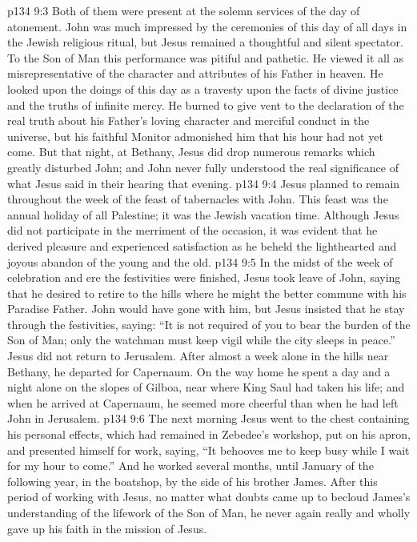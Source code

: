 \vs p134 9:3 Both of them were present at the solemn services of the day of atonement. John was much impressed by the ceremonies of this day of all days in the Jewish religious ritual, but Jesus remained a thoughtful and silent spectator. To the Son of Man this performance was pitiful and pathetic. He viewed it all as misrepresentative of the character and attributes of his Father in heaven. He looked upon the doings of this day as a travesty upon the facts of divine justice and the truths of infinite mercy. He burned to give vent to the declaration of the real truth about his Father’s loving character and merciful conduct in the universe, but his faithful Monitor admonished him that his hour had not yet come. But that night, at Bethany, Jesus did drop numerous remarks which greatly disturbed John; and John never fully understood the real significance of what Jesus said in their hearing that evening.
\vs p134 9:4 Jesus planned to remain throughout the week of the feast of tabernacles with John. This feast was the annual holiday of all Palestine; it was the Jewish vacation time. Although Jesus did not participate in the merriment of the occasion, it was evident that he derived pleasure and experienced satisfaction as he beheld the lighthearted and joyous abandon of the young and the old.\plusone
\vs p134 9:5 In the midst of the week of celebration and ere the festivities were finished, Jesus took leave of John, saying that he desired to retire to the hills where he might the better commune with his Paradise Father. John would have gone with him, but Jesus insisted that he stay through the festivities, saying: \textcolor{ubdarkred}{“It is not required of you to bear the burden of the Son of Man; only the watchman must keep vigil while the city sleeps in peace.”} Jesus did not return to Jerusalem. After almost a week alone in the hills near Bethany, he departed for Capernaum. On the way home he spent a day and a night alone on the slopes of Gilboa, near where King Saul had taken his life; and when he arrived at Capernaum, he seemed more cheerful than when he had left John in Jerusalem.
\vs p134 9:6 The next morning Jesus went to the chest containing his personal effects, which had remained in Zebedee’s workshop, put on his apron, and presented himself for work, saying, \textcolor{ubdarkred}{“It behooves me to keep busy while I wait for my hour to come.”} And he worked several months, until January of the following year, in the boatshop, by the side of his brother James. After this period of working with Jesus, no matter what doubts came up to becloud James’s understanding of the lifework of the Son of Man, he never again really and wholly gave up his faith in the mission of Jesus.
